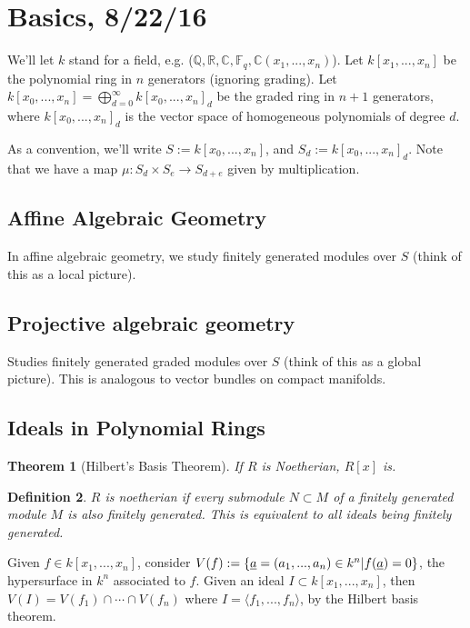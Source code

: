 \documentclass[letterpaper, 12pt]{article}
\newtheorem{thm}{Theorem}[subsection]
\newtheorem{definition}[thm]{Definition}
\newcommand{\rats}{\mathbb{Q}}
\newcommand{\reals}{\mathbb{R}}
\newcommand{\cmplx}{\mathbb{C}}
\newcommand{\polyring}[3]{#1[x_{#2}, ..., x_{#3}]}
\newcommand{\graded}[2]{\bigoplus_{d = 0}^\infty \polyring{#1}{0}{#2}_d}
\newcommand{\ffield}[1]{\mathbb{F}_{#1}}
\begin{document}
\section{Basics, 8/22/16} We'll let $k$ stand for a field, e.g. ($\rats,
\reals, \cmplx, \ffield q, \cmplx(x_1, ..., x_n)$). Let $\polyring k 1 n$ be
the polynomial ring in $n$ generators (ignoring grading). Let $\polyring k 0 n
= \graded k n$ be the graded ring in $n + 1$ generators, where
$\polyring{k}{0}{n}_d$ is the vector space of homogeneous polynomials of
degree $d$.

As a convention, we'll write $S := \polyring k 0 n$, and $S_d :=
\polyring{k}{0}{n}_d$. Note that we have a map $\mu: S_d \times S_e
\rightarrow S_{d + e}$ given by multiplication.

\subsection{Affine Algebraic Geometry} In affine algebraic geometry, we study
finitely generated modules over $S$ (think of this as a local picture).

\subsection{Projective algebraic geometry} Studies finitely generated graded
modules over $S$ (think of this as a global picture). This is analogous to
vector bundles on compact manifolds.

\subsection{Ideals in Polynomial Rings}
\begin{thm}[Hilbert's Basis Theorem]
If $R$ is Noetherian, $R[x]$ is.
\end{thm}

\begin{definition} $R$ is noetherian if every submodule $N \subset M$ of a
finitely generated module $M$ is also finitely generated. This is equivalent
to all ideals being finitely generated. \end{definition}

Given $f \in \polyring k 1 n$, consider $V(f) := \{ \uline{a} = (a_1, ...,
a_n) \in k^n | f(\uline{a}) = 0\}$, the hypersurface in $k^n$ associated to
$f$. Given an ideal $I \subset \polyring k 1 n$, then $V(I) = V(f_1) \cap
\cdots \cap V(f_n)$ where $I = \langle f_1, ..., f_n \rangle$, by the Hilbert
basis theorem.
\end{document}
